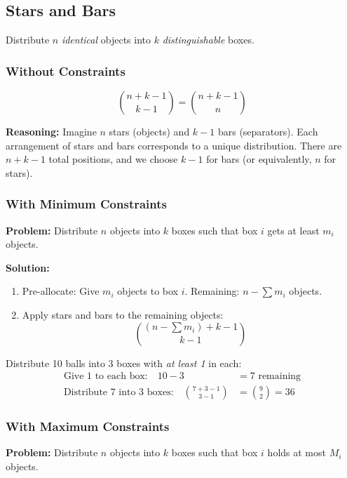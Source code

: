 \documentclass[12pt]{extarticle}
\begin{document}
\subsection{Stars and Bars}

Distribute $n$ \textit{identical} objects into $k$ \textit{distinguishable} boxes.

\subsubsection{Without Constraints}

\[
\binom{n+k-1}{k-1} = \binom{n+k-1}{n}
\]

\textbf{Reasoning:} Imagine $n$ stars (objects) and $k-1$ bars (separators). Each arrangement of stars and bars corresponds to a unique distribution. There are $n+k-1$ total positions, and we choose $k-1$ for bars (or equivalently, $n$ for stars).

\subsubsection{With Minimum Constraints}

\textbf{Problem:} Distribute $n$ objects into $k$ boxes such that box $i$ gets at least $m_i$ objects.

\textbf{Solution:} 
\begin{enumerate}
    \item Pre-allocate: Give $m_i$ objects to box $i$. Remaining: $n - \sum m_i$ objects.
    \item Apply stars and bars to the remaining objects:
    \[
    \binom{(n - \sum m_i) + k - 1}{k-1}
    \]
\end{enumerate}

\begin{examplebox}
Distribute 10 balls into 3 boxes with \textit{at least 1} in each:
\begin{align*}
\text{Give 1 to each box:} \quad 10 - 3 &= 7 \text{ remaining} \\
\text{Distribute 7 into 3 boxes:} \quad \binom{7+3-1}{3-1} &= \binom{9}{2} = 36
\end{align*}
\end{examplebox}

\subsubsection{With Maximum Constraints}

\textbf{Problem:} Distribute $n$ objects into $k$ boxes such that box $i$ holds at most $M_i$ objects.
\end{document}
